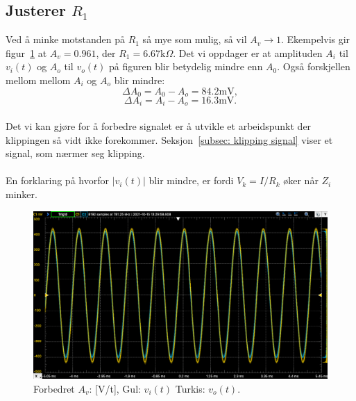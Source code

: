 \documentclass[a4paper,11pt,norsk]{article}
\begin{document}
\subsection{Justerer $R_1$}\label{subsec: improved signal}
Ved å minke motstanden på $R_1$ så mye som mulig, så vil $A_v\rightarrow 1$. Ekempelvis gir figur~\ref{fig: improved signal} at $A_v = 0.961$, der $R_1 = 6.67$k$\Omega$.
Det vi oppdager er at amplituden $A_i$ til $v_i(t)$ og $A_o$ til $v_o(t)$ på figuren blir betydelig mindre enn $A_0$. Også forskjellen mellom mellom $A_i$ og $A_o$ blir mindre: \\
\begin{equation}\label{eq: delta A_0}
    \Delta A_0 = A_0 - A_o = 84.2\textrm{mV},
\end{equation}
\begin{equation}\label{eq: delta A_i}
    \Delta A_i = A_i - A_o = 16.3\textrm{mV}.
\end{equation}
\\
Det vi kan gjøre for å forbedre signalet er å utvikle et arbeidspunkt der klippingen så vidt ikke forekommer. Seksjon~\ref{subsec: klipping signal} viser et signal, som nærmer seg klipping. 
\\
\\ En forklaring på hvorfor $|v_i(t)|$ blir mindre, er fordi $V_k = I / R_k$ øker når $Z_i$ minker.

\begin{figure}[htbp]
    \centering
    \includegraphics[width=1.0\textwidth]{img/Improved signal.png}
    \caption{Forbedret $A_v$: [V/t], Gul: $v_i(t)$ Turkis: $v_o(t)$.}
    \label{fig: improved signal}
\end{figure}\\
\newpage
\end{document}
